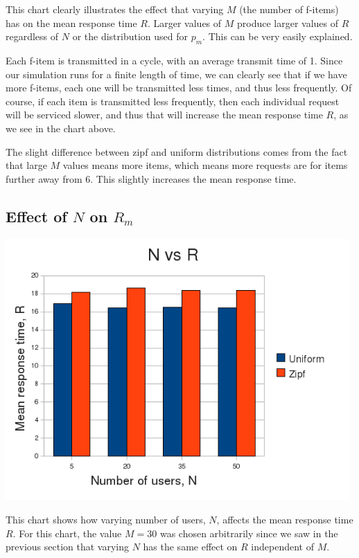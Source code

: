 \documentclass[12pt]{article}
\begin{document}
This chart clearly illustrates the effect that varying $M$ (the number of
f-items) has on the mean response time $R$.  Larger values of $M$ produce larger
values of $R$ regardless of $N$ or the distribution used for $p_m$.  This can be
very easily explained.

Each f-item is transmitted in a cycle, with an average transmit time of 1.
Since our simulation runs for a finite length of time, we can clearly see that
if we have more f-items, each one will be transmitted less times, and thus less
frequently.  Of course, if each item is transmitted less frequently, then each
individual request will be serviced slower, and thus that will increase the mean
response time $R$, as we see in the chart above.

The slight difference between zipf and uniform distributions comes from the fact
that large $M$ values means more items, which means more requests are for items
further away from 6.  This slightly increases the mean response time.


\newpage
\begin{table}[htp!]
\subsection{Effect of $N$ on $R_m$}
\begin{center}
\includegraphics[height=10cm]{R_vs_N.png}
\end{center}
\end{table}

This chart shows how varying number of users, $N$, affects the mean response
time $R$.  For this chart, the value $M = 30$ was chosen arbitrarily since we
saw in the previous section that varying $N$ has the same effect on $R$
independent of $M$.
\end{document}
